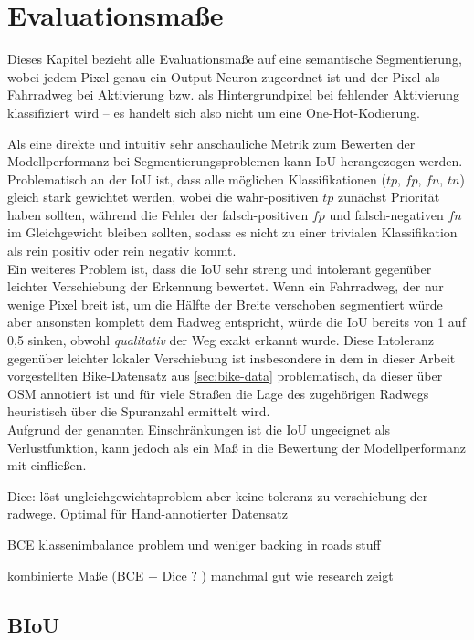 \section{Evaluationsmaße}

Dieses Kapitel bezieht alle Evaluationsmaße auf eine semantische Segmentierung, wobei jedem Pixel genau ein Output-Neuron 
zugeordnet ist und der Pixel als Fahrradweg bei Aktivierung bzw. als Hintergrundpixel bei fehlender Aktivierung klassifiziert wird --
es handelt sich also nicht um eine One-Hot-Kodierung.

Als eine direkte und intuitiv sehr anschauliche Metrik zum Bewerten der Modellperformanz bei Segmentierungsproblemen
kann \ac{IoU} herangezogen werden. \\ 
Problematisch an der \ac{IoU} ist, dass alle möglichen Klassifikationen ($tp$, $fp$, $fn$, $tn$)
gleich stark gewichtet werden, wobei die wahr-positiven $tp$ zunächst Priorität haben sollten, 
während die Fehler der falsch-positiven $fp$ und falsch-negativen $fn$ im Gleichgewicht bleiben sollten, 
sodass es nicht zu einer trivialen Klassifikation als rein positiv oder rein negativ kommt. \\
Ein weiteres Problem ist, dass die \ac{IoU} sehr streng und intolerant gegenüber leichter Verschiebung der Erkennung 
bewertet. Wenn ein Fahrradweg, der nur wenige Pixel breit ist, um die Hälfte der Breite verschoben segmentiert würde
aber ansonsten komplett dem Radweg entspricht, würde die \ac{IoU} bereits von 1 auf 0,5 sinken, obwohl \textit{qualitativ} 
der Weg exakt erkannt wurde. Diese Intoleranz gegenüber leichter lokaler Verschiebung ist insbesondere in dem 
in dieser Arbeit vorgestellten Bike-Datensatz aus \autoref{sec:bike-data} problematisch, 
da dieser über \ac{OSM} annotiert ist und für viele Straßen die Lage des zugehörigen Radwegs heuristisch über 
die Spuranzahl ermittelt wird. \\
Aufgrund der genannten Einschränkungen ist die \ac{IoU} ungeeignet als Verlustfunktion, kann jedoch als ein Maß 
in die Bewertung der Modellperformanz mit einfließen. 

Dice: löst ungleichgewichtsproblem aber keine toleranz zu verschiebung der radwege. 
Optimal für Hand-annotierter Datensatz

BCE klassenimbalance problem und weniger backing in roads stuff

kombinierte Maße (BCE + Dice ? ) manchmal gut wie research zeigt

\subsection{\acf{BIoU}} \label{sec:eval:biou}

